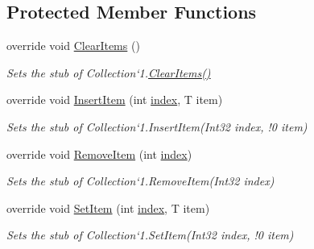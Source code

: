 \subsection*{Protected Member Functions}
\begin{DoxyCompactItemize}
\item 
override void \hyperlink{class_system_1_1_collections_1_1_object_model_1_1_fakes_1_1_stub_collection_3_01_t_01_4_a87e7346e9e447dfaadf5b248f3077962}{Clear\-Items} ()
\begin{DoxyCompactList}\small\item\em Sets the stub of Collection`1.\hyperlink{class_system_1_1_collections_1_1_object_model_1_1_fakes_1_1_stub_collection_3_01_t_01_4_a87e7346e9e447dfaadf5b248f3077962}{Clear\-Items()}\end{DoxyCompactList}\item 
override void \hyperlink{class_system_1_1_collections_1_1_object_model_1_1_fakes_1_1_stub_collection_3_01_t_01_4_ace1c01e72bf6c5f739b6d09f6b6a786d}{Insert\-Item} (int \hyperlink{jquery-1_810_82-vsdoc_8js_a75bb12d1f23302a9eea93a6d89d0193e}{index}, T item)
\begin{DoxyCompactList}\small\item\em Sets the stub of Collection`1.Insert\-Item(Int32 index, !0 item)\end{DoxyCompactList}\item 
override void \hyperlink{class_system_1_1_collections_1_1_object_model_1_1_fakes_1_1_stub_collection_3_01_t_01_4_a32d0507b18adebd15a1fe36849a44de3}{Remove\-Item} (int \hyperlink{jquery-1_810_82-vsdoc_8js_a75bb12d1f23302a9eea93a6d89d0193e}{index})
\begin{DoxyCompactList}\small\item\em Sets the stub of Collection`1.Remove\-Item(\-Int32 index)\end{DoxyCompactList}\item 
override void \hyperlink{class_system_1_1_collections_1_1_object_model_1_1_fakes_1_1_stub_collection_3_01_t_01_4_ae9cc184f6fbe0ce64562c3a9e63e37cb}{Set\-Item} (int \hyperlink{jquery-1_810_82-vsdoc_8js_a75bb12d1f23302a9eea93a6d89d0193e}{index}, T item)
\begin{DoxyCompactList}\small\item\em Sets the stub of Collection`1.Set\-Item(Int32 index, !0 item)\end{DoxyCompactList}\end{DoxyCompactItemize}
